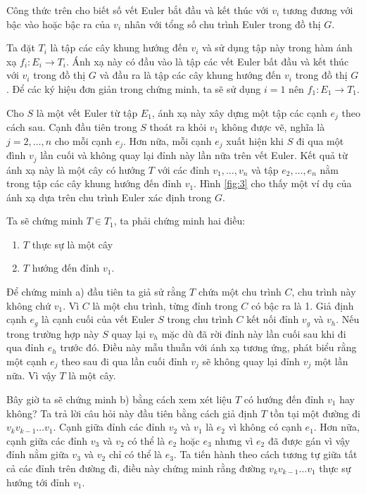 \documentclass[14pt, a4paper]{article}
\numberwithin{equation}{section}
\numberwithin{figure}{section}
\numberwithin{dl}{section}
\numberwithin{md}{section}
\numberwithin{bd}{section}
\numberwithin{dn}{section}
\numberwithin{hq}{section}
\begin{document}
    Công thức trên cho biết số vết Euler bắt đầu và kết thúc với $v_i$ tương đương với bậc vào hoặc bậc ra của $v_i$ nhân với tổng số chu trình Euler trong đồ thị $G$.

    Ta đặt $T_i$ là tập các cây khung hướng đến $v_i$ và sử dụng tập này trong hàm ánh xạ $f_i: E_i \rightarrow T_i$.
    Ánh xạ này có đầu vào là tập các vết Euler bất đầu và kết thúc với $v_i$ trong đồ thị $G$ và đầu ra là tập các cây khung hướng đến $v_i$ trong đồ thị $G$.
    Để các ký hiệu đơn giản trong chứng minh, ta sẽ sử dụng $i=1$ nên $f_1: E_1 \rightarrow T_1$.

    Cho $S$ là một vết Euler từ tập $E_1$, ánh xạ này xây dựng một tập các cạnh $e_j$ theo cách sau.
    Cạnh đầu tiên trong $S$ thoát ra khỏi $v_1$ không được vẽ, nghĩa là $j=2,\dots, n$ cho mỗi cạnh $e_j$.
    Hơn nữa, mỗi cạnh $e_j$ xuất hiện khi $S$ đi qua một đình $v_j$ lần cuối và không quay lại đỉnh này lần nữa trên vết Euler.
    Kết quả từ ánh xạ này là một cây có hướng $T$ với các đỉnh $v_1, \dots, v_n$ và tập $e_2, \dots, e_n$ nằm trong tập các cây khung hướng đến đỉnh $v_1$.
    Hình \ref{fig:3} cho thấy một ví dụ của ánh xạ dựa trên chu trình Euler xác định trong $G$.

    Ta sẽ chứng minh $T \in T_1$, ta phải chứng minh hai điều:

    \begin{enumerate}[label=(\alph*)]
        \item $T$ thực sự là một cây
        \item $T$ hướng đến đỉnh $v_1$.
    \end{enumerate}

    Để chứng minh a) đầu tiên ta giả sử rằng $T$ chứa một chu trình $C$, chu trình này không chứ $v_1$.
    Vì $C$ là một chu trình, từng đỉnh trong $C$ có bậc ra là 1.
    Giả định cạnh $e_g$ là cạnh cuối của vết Euler $S$ trong chu trình $C$ kết nối đỉnh $v_g$ và $v_h$.
    Nếu trong trường hợp này $S$ quay lại $v_h$ mặc dù đã rời đỉnh này lần cuối sau khi đi qua đỉnh $e_h$ trước đó.
    Điều này mẫu thuẫn với ánh xạ tương ứng, phát biểu rằng một cạnh $e_j$ theo sau đi qua lần cuối đỉnh $v_j$ sẽ không quay lại đỉnh $v_j$ một lần nữa.
    Vì vậy $T$ là một cây.

    Bây giờ ta sẽ chứng minh b) bằng cách xem xét liệu $T$ có hướng đến đỉnh $v_1$ hay không?
    Ta trả lời câu hỏi này đầu tiên bằng cách giả định $T$ tồn tại một đường đi $v_k v_{k-1} \dots v_1$.
    Cạnh giữa đỉnh các đỉnh $v_2$ và $v_1$ là $e_2$ vì không có cạnh $e_1$.
    Hơn nữa, cạnh giữa các đỉnh $v_3$ và $v_2$ có thể là $e_2$ hoặc $e_3$ nhưng vì $e_2$ đã được gán vì vậy đỉnh nằm giữa $v_3$ và $v_2$ chỉ có thể là $e_3$.
    Ta tiến hành theo cách tương tự giữa tất cả các đỉnh trên đường đi, điều này chứng minh rằng đường $v_k v_{k-1} \dots v_1$ thực sự hướng tới đỉnh $v_1$.
\end{document}
